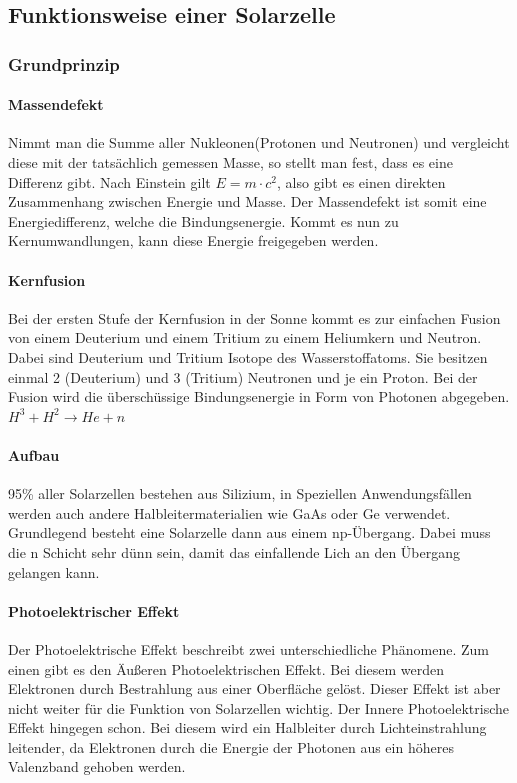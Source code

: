 \subsection{Funktionsweise einer Solarzelle}

	\subsubsection{Grundprinzip}
	
		\paragraph{Massendefekt}
		Nimmt man die Summe aller Nukleonen(Protonen und Neutronen) und vergleicht diese mit der tatsächlich gemessen Masse, so stellt man fest, dass es eine Differenz gibt. Nach Einstein gilt  $E = m\cdot c^2$, also gibt es einen direkten Zusammenhang zwischen Energie und Masse. Der Massendefekt ist somit eine Energiedifferenz, welche die Bindungsenergie. Kommt es nun zu Kernumwandlungen, kann diese Energie freigegeben werden.
		
		\paragraph{Kernfusion}
		Bei der ersten Stufe der Kernfusion in der Sonne kommt es zur einfachen Fusion von einem Deuterium und einem Tritium zu einem Heliumkern und Neutron. Dabei sind Deuterium und Tritium Isotope des Wasserstoffatoms. Sie besitzen einmal 2 (Deuterium) und 3 (Tritium) Neutronen und je ein Proton. Bei der Fusion wird die überschüssige Bindungsenergie in Form von Photonen abgegeben.
		$H^3 + H^2 \rightarrow He + n$
		
		\paragraph{Aufbau}
		95\% aller Solarzellen bestehen aus Silizium, in Speziellen Anwendungsfällen werden auch andere Halbleitermaterialien wie GaAs oder Ge verwendet. Grundlegend besteht eine Solarzelle dann aus einem np-Übergang. Dabei muss die n Schicht sehr dünn sein, damit das einfallende Lich an den Übergang gelangen kann.
		
		\paragraph{Photoelektrischer Effekt}
		Der Photoelektrische Effekt beschreibt zwei unterschiedliche Phänomene. Zum einen gibt es den Äußeren Photoelektrischen Effekt. Bei diesem werden Elektronen durch Bestrahlung aus einer Oberfläche gelöst. Dieser Effekt ist aber nicht weiter für die Funktion von Solarzellen wichtig. Der Innere Photoelektrische Effekt hingegen schon. Bei diesem wird ein Halbleiter durch Lichteinstrahlung leitender, da Elektronen durch die Energie der Photonen aus ein höheres Valenzband gehoben werden.
		
